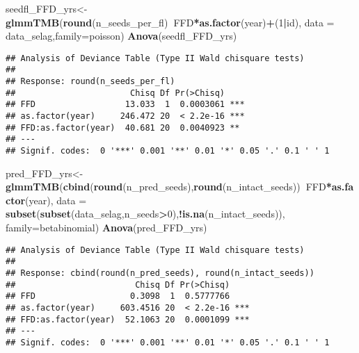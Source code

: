 \documentclass[
]{article}
\newenvironment{Shaded}{\begin{snugshade}}{\end{snugshade}}
\newcommand{\DataTypeTok}[1]{\textcolor[rgb]{0.13,0.29,0.53}{#1}}
\newcommand{\DecValTok}[1]{\textcolor[rgb]{0.00,0.00,0.81}{#1}}
\newcommand{\KeywordTok}[1]{\textcolor[rgb]{0.13,0.29,0.53}{\textbf{#1}}}
\newcommand{\NormalTok}[1]{#1}
\newcommand{\OperatorTok}[1]{\textcolor[rgb]{0.81,0.36,0.00}{\textbf{#1}}}
\begin{document}
\begin{Shaded}
\begin{Highlighting}[]
\NormalTok{seedfl_FFD_yrs<-}\KeywordTok{glmmTMB}\NormalTok{(}\KeywordTok{round}\NormalTok{(n_seeds_per_fl)}\OperatorTok{~}\NormalTok{FFD}\OperatorTok{*}\KeywordTok{as.factor}\NormalTok{(year)}\OperatorTok{+}\NormalTok{(}\DecValTok{1}\OperatorTok{|}\NormalTok{id),}
                      \DataTypeTok{data =}\NormalTok{ data_selag,}\DataTypeTok{family=}\NormalTok{poisson)}
\KeywordTok{Anova}\NormalTok{(seedfl_FFD_yrs)}
\end{Highlighting}
\end{Shaded}

\begin{verbatim}
## Analysis of Deviance Table (Type II Wald chisquare tests)
## 
## Response: round(n_seeds_per_fl)
##                       Chisq Df Pr(>Chisq)    
## FFD                  13.033  1  0.0003061 ***
## as.factor(year)     246.472 20  < 2.2e-16 ***
## FFD:as.factor(year)  40.681 20  0.0040923 ** 
## ---
## Signif. codes:  0 '***' 0.001 '**' 0.01 '*' 0.05 '.' 0.1 ' ' 1
\end{verbatim}

\begin{Shaded}
\begin{Highlighting}[]
\NormalTok{pred_FFD_yrs<-}\KeywordTok{glmmTMB}\NormalTok{(}\KeywordTok{cbind}\NormalTok{(}\KeywordTok{round}\NormalTok{(n_pred_seeds),}\KeywordTok{round}\NormalTok{(n_intact_seeds))}\OperatorTok{~}\NormalTok{FFD}\OperatorTok{*}\KeywordTok{as.factor}\NormalTok{(year),}
                      \DataTypeTok{data =} \KeywordTok{subset}\NormalTok{(}\KeywordTok{subset}\NormalTok{(data_selag,n_seeds}\OperatorTok{>}\DecValTok{0}\NormalTok{),}\OperatorTok{!}\KeywordTok{is.na}\NormalTok{(n_intact_seeds)),}
                      \DataTypeTok{family=}\NormalTok{betabinomial)}
\KeywordTok{Anova}\NormalTok{(pred_FFD_yrs)}
\end{Highlighting}
\end{Shaded}

\begin{verbatim}
## Analysis of Deviance Table (Type II Wald chisquare tests)
## 
## Response: cbind(round(n_pred_seeds), round(n_intact_seeds))
##                        Chisq Df Pr(>Chisq)    
## FFD                   0.3098  1  0.5777766    
## as.factor(year)     603.4516 20  < 2.2e-16 ***
## FFD:as.factor(year)  52.1063 20  0.0001099 ***
## ---
## Signif. codes:  0 '***' 0.001 '**' 0.01 '*' 0.05 '.' 0.1 ' ' 1
\end{verbatim}
\end{document}
